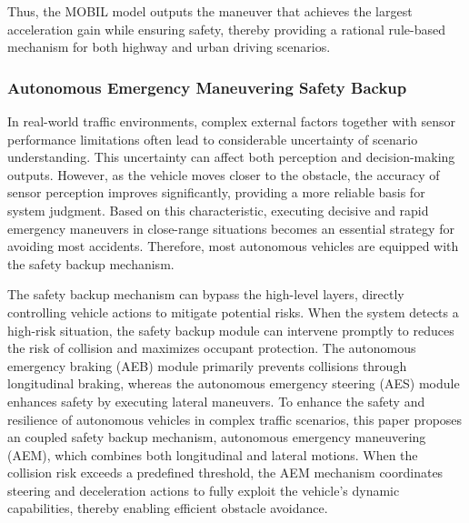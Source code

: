 \documentclass[preprint,12pt,authoryear]{elsarticle}
\begin{document}
Thus, the MOBIL model outputs the maneuver that achieves the largest acceleration gain while ensuring safety, thereby providing a rational rule-based mechanism for both highway and urban driving scenarios.

\subsubsection{Autonomous Emergency Maneuvering Safety Backup}

In real-world traffic environments, complex external factors together with sensor performance limitations often lead to considerable uncertainty of scenario understanding. This uncertainty can affect both perception and decision-making outputs. However, as the vehicle moves closer to the obstacle, the accuracy of sensor perception improves significantly, providing a more reliable basis for system judgment. Based on this characteristic, executing decisive and rapid emergency maneuvers in close-range situations becomes an essential strategy for avoiding most accidents. Therefore, most autonomous vehicles are equipped with the safety backup mechanism.

The safety backup mechanism can bypass the high-level layers, directly controlling vehicle actions to mitigate potential risks. When the system detects a high-risk situation, the safety backup module can intervene promptly to reduces the risk of collision and maximizes occupant protection. The autonomous emergency braking (AEB) module primarily prevents collisions through longitudinal braking, whereas the autonomous emergency steering (AES) module enhances safety by executing lateral maneuvers. To enhance the safety and resilience of autonomous vehicles in complex traffic scenarios, this paper proposes an coupled safety backup mechanism, autonomous emergency maneuvering (AEM), which combines both longitudinal and lateral motions. When the collision risk exceeds a predefined threshold, the AEM mechanism coordinates steering and deceleration actions to fully exploit the vehicle’s dynamic capabilities, thereby enabling efficient obstacle avoidance.

\end{document}
